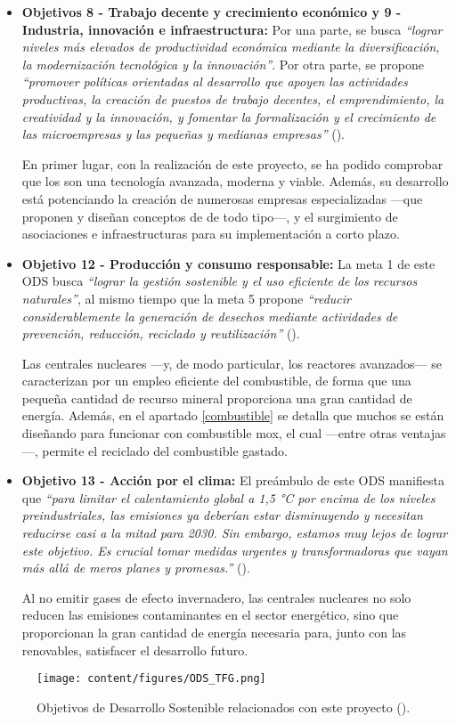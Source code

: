 \begin{itemize}
    \item \textbf{Objetivos 8 - Trabajo decente y crecimiento económico y 9 - Industria, innovación e infraestructura:} Por una parte, se busca \textit{``lograr niveles más elevados de productividad económica mediante la diversificación, la modernización tecnológica y la innovación''}. Por otra parte, se propone \textit{``promover políticas orientadas al desarrollo que apoyen las actividades productivas, la creación de puestos de trabajo decentes, el emprendimiento, la creatividad y la innovación, y fomentar la formalización y el crecimiento de las microempresas y las pequeñas y medianas empresas''} (\cite{ODS}).
    
    En primer lugar, con la realización de este proyecto, se ha podido comprobar que los  son una tecnología avanzada, moderna y viable. Además, su desarrollo está potenciando la creación de numerosas empresas especializadas ---que proponen y diseñan conceptos de  de todo tipo---, y el surgimiento de asociaciones e infraestructuras para su implementación a corto plazo.

    \item \textbf{Objetivo 12 - Producción y consumo responsable:} La meta 1 de este ODS busca \textit{``lograr la gestión sostenible y el uso eficiente de los recursos naturales''}, al mismo tiempo que la meta 5 propone \textit{``reducir considerablemente la generación de desechos mediante actividades de prevención, reducción, reciclado y reutilización''} (\cite{ODS}).
    
    Las centrales nucleares ---y, de modo particular, los reactores avanzados--- se caracterizan por un empleo eficiente del combustible, de forma que una pequeña cantidad de recurso mineral proporciona una gran cantidad de energía. Además, en el apartado \ref{combustible} se detalla que muchos  se están diseñando para funcionar con combustible \acrshort{mox}, el cual ---entre otras ventajas---, permite el reciclado del combustible gastado. 
    
    \item \textbf{Objetivo 13 - Acción por el clima:} El preámbulo de este ODS manifiesta que \textit{``para limitar el calentamiento global a 1,5 °C por encima de los niveles preindustriales, las emisiones ya deberían estar disminuyendo y necesitan reducirse casi a la mitad para 2030. Sin embargo, estamos muy lejos de lograr este objetivo.
    Es crucial tomar medidas urgentes y transformadoras que vayan más allá de meros planes y promesas.''} (\cite{ODS}).

    Al no emitir gases de efecto invernadero, las centrales nucleares no solo reducen las emisiones contaminantes en el sector energético, sino que proporcionan la gran cantidad de energía necesaria para, junto con las renovables, satisfacer el desarrollo futuro.
\end{itemize}

\begin{figure}[h!]
    \centering
    \texttt{[image: content/figures/ODS\_TFG.png]}
    \caption{Objetivos de Desarrollo Sostenible relacionados con este proyecto (\cite{ODS}).}
    \label{fig:ods_tfg}
  \end{figure}